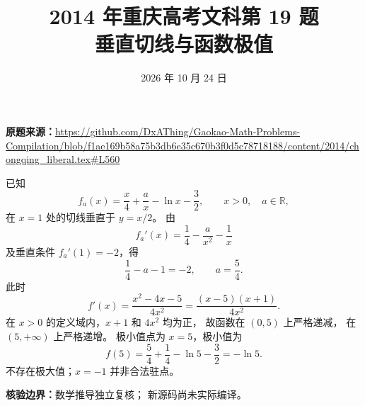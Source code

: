 \documentclass[UTF8,a4paper,11pt]{ctexart}
\title{2014 年重庆高考文科第 19 题\\垂直切线与函数极值}
\date{2026 年 10 月 24 日}
\begin{document}
\maketitle
\noindent\textbf{原题来源：}\url{https://github.com/DxAThing/Gaokao-Math-Problems-Compilation/blob/f1ae169b58a75b3db6e35c670b3f0d5c78718188/content/2014/chongqing_liberal.tex#L560}

已知
\[
 f_a(x)=\frac{x}{4}+\frac{a}{x}-\ln x-\frac32,
 \qquad x>0,\quad a\in\mathbb R,
\]
在 $x=1$ 处的切线垂直于 $y=x/2$。
由
\[
 f_a'(x)=\frac14-\frac{a}{x^2}-\frac1x
\]
及垂直条件 $f_a'(1)=-2$，得
\[
 \frac14-a-1=-2,\qquad \boxed{a=\frac54}.
\]
此时
\[
 f'(x)=\frac{x^2-4x-5}{4x^2}
 =\frac{(x-5)(x+1)}{4x^2}.
\]
在 $x>0$ 的定义域内，$x+1$ 和 $4x^2$ 均为正，
故函数在 $(0,5)$ 上严格递减，
在 $(5,+\infty)$ 上严格递增。
极小值点为 $x=5$，极小值为
\[
 \boxed{f(5)=\frac54+\frac14-\ln5-\frac32=-\ln5}.
\]
不存在极大值；$x=-1$ 并非合法驻点。

\noindent\textbf{核验边界：}数学推导独立复核；
新源码尚未实际编译。
\end{document}
